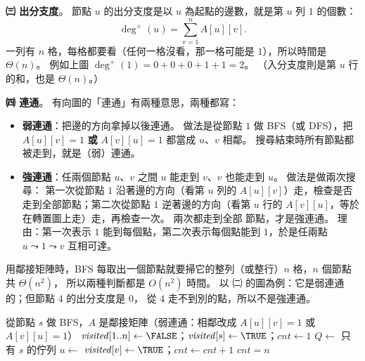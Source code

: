\begin{pastsoln}
\textbf{㈢ 出分支度}。 節點 $u$ 的出分支度是以 $u$ 為起點的邊數，就是第 $u$ 列 $1$ 的個數：
\[
\deg^{+}(u) = \sum_{v=1}^{n} A[u][v].
\]
一列有 $n$ 格，每格都要看（任何一格沒看，那一格可能是 $1$），所以時間是 $\Theta(n)$。 例如上圖
$\deg^{+}(1) = 0 + 0 + 0 + 1 + 1 = 2$。 （入分支度則是第 $u$ 行的和，也是 $\Theta(n)$。）

\textbf{㈣ 連通}。 有向圖的「連通」有兩種意思，兩種都寫：
\begin{itemize}
\item \textbf{弱連通}：把邊的方向拿掉以後連通。 做法是從節點 $1$ 做 BFS（或 DFS），把 $A[u][v] = 1$
\textbf{或} $A[v][u] = 1$ 都當成 $u$、$v$ 相鄰。 搜尋結束時所有節點都被走到，就是（弱）連通。
\item \textbf{強連通}：任兩個節點 $u$、$v$ 之間 $u$ 能走到 $v$、$v$ 也能走到 $u$。 做法是做兩次搜尋：
第一次從節點 $1$ 沿著邊的方向（看第 $u$ 列的 $A[u][v]$）走，檢查是否走到全部節點；第二次從節點
$1$ 逆著邊的方向（看第 $u$ 行的 $A[v][u]$，等於在轉置圖上走）走，再檢查一次。 兩次都走到全部
節點，才是強連通。 理由：第一次表示 $1$ 能到每個點，第二次表示每個點能到 $1$，於是任兩點
$u \leadsto 1 \leadsto v$ 互相可達。
\end{itemize}
用鄰接矩陣時，BFS 每取出一個節點就要掃它的整列（或整行）$n$ 格，$n$ 個節點共 $\Theta(n^2)$，
所以兩種判斷都是 $O(n^2)$ 時間。 以 ㈡ 的圖為例：它是弱連通的；但節點 $4$ 的出分支度是 $0$，
從 $4$ 走不到別的點，所以不是強連通。
\begin{pseudo}[unbreakable]{從節點 $s$ 做 BFS，$A$ 是鄰接矩陣（弱連通：相鄰改成 $A[u][v] = 1$ 或 $A[v][u] = 1$）}
    \State $\mathit{visited}[1..n] \gets \FALSE$；$\mathit{visited}[s] \gets \TRUE$；$\mathit{cnt} \gets 1$
    \State $Q \gets$ 只有 $s$ 的佇列
        \State $u \gets$ 
                \State $\mathit{visited}[v] \gets \TRUE$；$\mathit{cnt} \gets \mathit{cnt} + 1$
                \State {}
            \EndIf
        \EndFor
    \EndWhile
    \State \Return $\mathit{cnt} = n$
\EndFunction
\end{pseudo}
\end{pastsoln}
